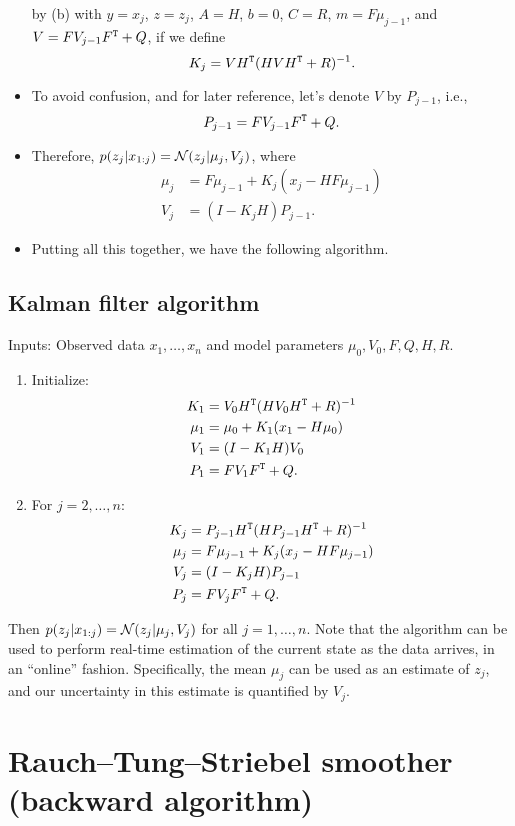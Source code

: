 \documentclass[12pt]{article}
\begin{document}
\begin{itemize}
by (b) with $y = x_j$, $z = z_j$, $A = H$, $b = 0$, $C = R$, $m = F \mu_{j-1}$, and $V = F V_{j-1} F^{\mathtt{T}} + Q$, if we define
$$ K_j = V H^{\mathtt{T}}(H V H^{\mathtt{T}} + R)^{-1}. $$
\item To avoid confusion, and for later reference, let's denote $V$ by $P_{j-1}$, i.e.,
$$ P_{j-1} = F V_{j-1} F^{\mathtt{T}} + Q. $$
\item Therefore, $p(z_j | x_{1:j}) = \mathcal{N}(z_j | \mu_j,V_j)$, where
\begin{align*}
\mu_j & = F \mu_{j-1} + K_j(x_j - H F \mu_{j-1})\\
V_j & = (I - K_j H)P_{j-1}.
\end{align*}
\item Putting all this together, we have the following algorithm.
\end{itemize}

\subsection*{Kalman filter algorithm}
Inputs: Observed data $x_1,\ldots,x_n$ and model parameters $\mu_0,V_0,F,Q,H,R$.
\begin{enumerate}
\item Initialize:
\begin{align*}
K_1 &= V_0 H^{\mathtt{T}}(H V_0 H^{\mathtt{T}} + R)^{-1}\\
\mu_1 & = \mu_0+ K_1(x_1 - H \mu_0)\\
V_1 & = (I - K_1 H) V_0\\
P_1 &= F V_1 F^{\mathtt{T}} + Q.
\end{align*}
\item For $j = 2,\ldots,n$:
\begin{align*}
K_j &= P_{j-1} H^{\mathtt{T}}(H P_{j-1} H^{\mathtt{T}} + R)^{-1}\\
\mu_j & = F \mu_{j-1} + K_j(x_j - H F \mu_{j-1})\\
V_j & = (I - K_j H)P_{j-1}\\
P_j &= F V_j F^{\mathtt{T}} + Q.
\end{align*}
\end{enumerate}
Then $p(z_j | x_{1:j}) = \mathcal{N}(z_j | \mu_j,V_j)$ for all $j=1,\ldots,n$. Note that the algorithm can be used to perform real-time estimation of the current state as the data arrives, in an ``online'' fashion. Specifically, the mean $\mu_j$ can be used as an estimate of $z_j$, and our uncertainty in this estimate is quantified by $V_j$.


\section{Rauch--Tung--Striebel smoother (backward algorithm)}
\end{document}
